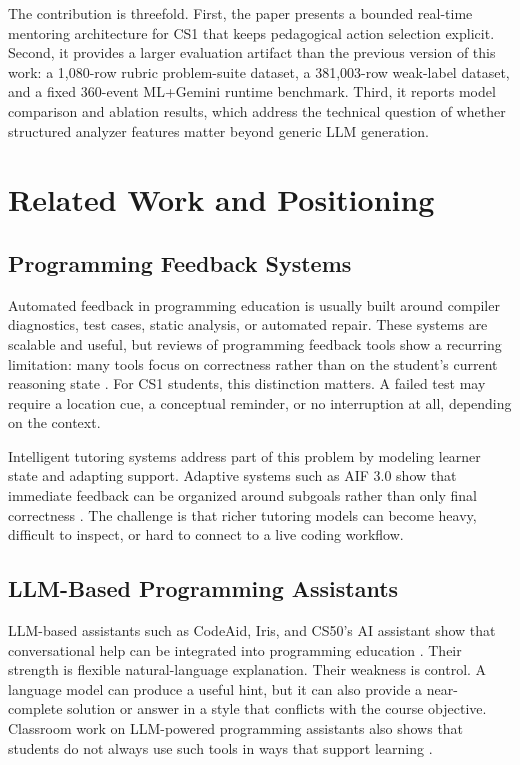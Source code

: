 \documentclass[conference]{IEEEtran}
\begin{document}
The contribution is threefold. First, the paper presents a bounded real-time mentoring architecture for CS1 that keeps pedagogical action selection explicit. Second, it provides a larger evaluation artifact than the previous version of this work: a 1,080-row rubric problem-suite dataset, a 381,003-row weak-label dataset, and a fixed 360-event ML+Gemini runtime benchmark. Third, it reports model comparison and ablation results, which address the technical question of whether structured analyzer features matter beyond generic LLM generation.

\section{Related Work and Positioning}

\subsection{Programming Feedback Systems}

Automated feedback in programming education is usually built around compiler diagnostics, test cases, static analysis, or automated repair. These systems are scalable and useful, but reviews of programming feedback tools show a recurring limitation: many tools focus on correctness rather than on the student's current reasoning state \cite{AutomatedGradingandFeedbackToolsforProgrammingEducationSystematicReview,NavigatingAutomatedFeedback}. For CS1 students, this distinction matters. A failed test may require a location cue, a conceptual reminder, or no interruption at all, depending on the context.

Intelligent tutoring systems address part of this problem by modeling learner state and adapting support. Adaptive systems such as AIF 3.0 show that immediate feedback can be organized around subgoals rather than only final correctness \cite{AdaptiveImmediateFeedbackforBlockBasedProgramming}. The challenge is that richer tutoring models can become heavy, difficult to inspect, or hard to connect to a live coding workflow.

\subsection{LLM-Based Programming Assistants}

LLM-based assistants such as CodeAid, Iris, and CS50's AI assistant show that conversational help can be integrated into programming education \cite{CodeAid,IRIS,ImprovingAIinCS50}. Their strength is flexible natural-language explanation. Their weakness is control. A language model can produce a useful hint, but it can also provide a near-complete solution or answer in a style that conflicts with the course objective. Classroom work on LLM-powered programming assistants also shows that students do not always use such tools in ways that support learning \cite{PatternsofLLMPoweredProgrammingAssistant,SystematicLiteratureReviewonLLM}.
\end{document}
